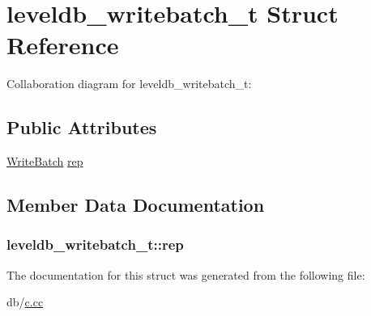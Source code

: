 \hypertarget{structleveldb__writebatch__t}{\section{leveldb\-\_\-writebatch\-\_\-t Struct Reference}
\label{structleveldb__writebatch__t}
}


Collaboration diagram for leveldb\-\_\-writebatch\-\_\-t\-:
\subsection*{Public Attributes}
\begin{DoxyCompactItemize}
\item 
\hyperlink{classleveldb_1_1_write_batch}{Write\-Batch} \hyperlink{structleveldb__writebatch__t_ac96538c849db578bea786bf29fae6e5f}{rep}
\end{DoxyCompactItemize}


\subsection{Member Data Documentation}
\hypertarget{structleveldb__writebatch__t_ac96538c849db578bea786bf29fae6e5f}{
\subsubsection[{rep}]{ leveldb\-\_\-writebatch\-\_\-t\-::rep}}\label{structleveldb__writebatch__t_ac96538c849db578bea786bf29fae6e5f}


The documentation for this struct was generated from the following file\-:\begin{DoxyCompactItemize}
\item 
db/\hyperlink{c_8cc}{c.\-cc}\end{DoxyCompactItemize}
